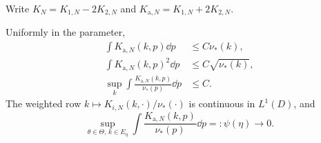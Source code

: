 Write $K_N=K_{1,N}-2K_{2,N}$ and $K_{\mathrm a,N}=K_{1,N}+2K_{2,N}$.
\begin{proposition}\label{geom:rows}
Uniformly in the parameter,
\begin{align}
 \int K_{\mathrm a,N}(k,p)\dd p&\le C\nu_*(k),\label{geom:rowplain}\\
 \int K_{\mathrm a,N}(k,p)^2\dd p&\le C\sqrt{\nu_*(k)},\label{geom:rowsquare}\\
 \sup_k\int\frac{K_{\mathrm a,N}(k,p)}{\nu_*(p)}\dd p&\le C.\label{geom:rowweighted}
\end{align}
The weighted row $k\mapsto K_{i,N}(k,\cdot)/\nu_*(\cdot)$ is continuous
in $L^1(D)$, and
\begin{equation}\label{geom:rowcorner}
 \sup_{\theta\in\Theta,\,k\in E_\eta}
     \int\frac{K_{\mathrm a,N}(k,p)}{\nu_*(p)}\dd p
       =:\psi(\eta)\longrightarrow0.
\end{equation}
\end{proposition}
